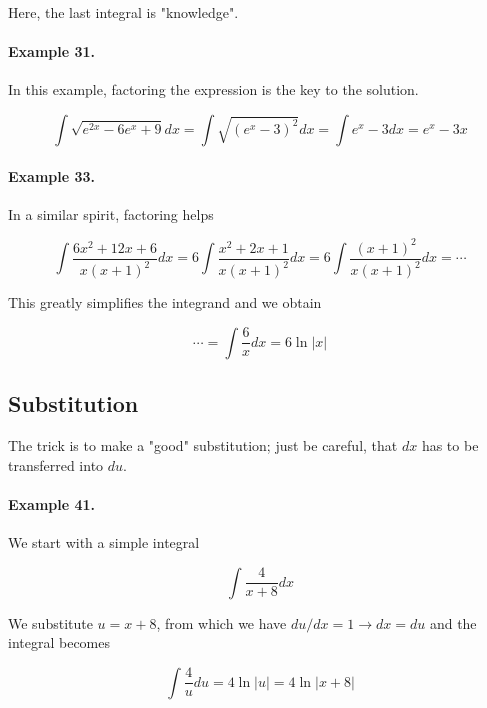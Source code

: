 Here, the last integral is "knowledge".

\paragraph{Example 31.} In this example, factoring the expression is the key to the solution.

\begin{equation*}
    \int \sqrt{e^{2x} - 6 e^{x} + 9} dx = \int \sqrt{(e^x - 3)^2} dx = \int e^x - 3 dx = e^x - 3x
\end{equation*}


\paragraph{Example 33.} In a similar spirit, factoring helps

\begin{equation*}
    \int \frac{6x^2 + 12x + 6}{x (x+1)^2} dx = 6 \int \frac{x^2 + 2x + 1}{x (x+1)^2} dx = 6 \int \frac{(x+1)^2}{x (x+1)^2} dx = \cdots
\end{equation*}

This greatly simplifies the integrand and we obtain

\begin{equation*}
    \cdots = \int \frac{6}{x} dx = 6 \ln |x|
\end{equation*}

\subsection{Substitution}

The trick is to make a "good" substitution; just be careful, that $dx$ has to be transferred into $du$.

\paragraph{Example 41.} We start with a simple integral

\begin{equation*}
    \int \frac{4}{x+8} dx
\end{equation*}

We substitute $u = x+8$, from which we have $du/dx = 1 \rightarrow dx = du$ and the integral becomes

\begin{equation*}
    \int \frac{4}{u} du = 4 \ln|u| = 4 \ln |x+8|
\end{equation*}

